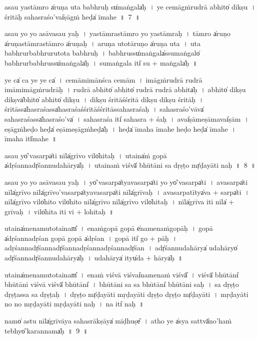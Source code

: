 \documentclass[parskip, DIV=14]{scrartcl}
\begin{document}
{\vspace{0.5cm}
a॒sau yastā॒mro a̍ru॒ṇa u॒ta ba॒bhruḥ su̍ma॒ṅgala̍ḥ~।
ye ce॒māgṁru॒drā a॒bhito̍ di॒kṣu~।
 śri॒tāḥ sahasra॒śo'vai̍ṣā॒gṁ॒ heḍa̍ īmahe~॥~7~॥

a॒sau yo yo a॒sāva॒sau yaḥ~।
yastā॒mrastā॒mro yo yastā॒mraḥ~।
tā॒mro a̍ru॒ṇo a̍ru॒ṇastā॒mrastā॒mro a̍ru॒ṇaḥ~।
a॒ru॒ṇa u॒totāru॒ṇo a̍ru॒ṇa u॒ta~।
u॒ta ba॒bhrurba॒bhruru॒tota ba॒bhruḥ~।
ba॒bhrussu̍ma॒ṅgala̍ssuma॒ṅgalo̍ ba॒bhrurba॒bhrussu̍ma॒ṅgala̍ḥ~।
su॒ma॒ṅgala॒ iti̍ su + ma॒ṅgala̍ḥ~॥

ye ca̍ ca॒ ye ye ca̍~।
ce॒māmi॒mānśca ce॒mām~।
i॒māgṁru॒drā ru॒drā  i॒māmi॒māgṁru॒drāḥ~।
ru॒drā a॒bhito̍ a॒bhito̍ ru॒drā ru॒drā a॒bhita̍ḥ~।
a॒bhito̍ di॒kṣu di॒kṣva̍bhito̍ a॒bhito̍ di॒kṣu~।
di॒kṣu śri॒tāśśri॒tā di॒kṣu di॒kṣu śri॒tāḥ~।
śri॒tāssa̍hasra॒śassa̍hasra॒śaśśri॒tāśśri॒tāssahasra॒śaḥ~।
sa॒ha॒sra॒śo'vāva̍ sahasra॒śassa̍hasra॒śo'va̍~।
sa॒ha॒sra॒śa iti̍ sahasra + śaḥ~।
avai̍ṣāmeṣā॒mavai̍ṣām~।
e॒ṣā॒gṁ॒heḍo॒ heḍa̍ eṣāmeṣā॒gṁ॒heḍa̍ḥ~।
heḍa̍ īmaha īmahe॒ heḍo॒ heḍa̍ īmahe~।
ī॒ma॒ha॒ itī̍mahe~॥

\vspace{0.5cm}
a॒sau yo̍'vasarpa̍ti॒ nīla̍grīvo॒ vilo̍hitaḥ~।
u॒taina̍ṁ go॒pā a̍dṛśa॒nnadṛ̍śannudahā॒rya̍ḥ~।
u॒taina॒ṁ viśvā̍ bhū॒tāni॒ sa dṛ॒ṣṭo mṛ̍ḍayāti naḥ~॥~8~॥

a॒sau yo yo a॒sāva॒sau yaḥ~।
yo̍'va॒sarpa̍tyava॒sarpa̍ti॒ yo yo̍'va॒sarpa̍ti~।
a॒va॒sarpa̍ti॒ nīla̍grīvo॒ nīla̍grīvo'va॒sarpa̍tyava॒sarpa̍ti॒ nīla̍grīvaḥ~।
a॒va॒sarpa॒tītya̍va + sarpa̍ti~।
nīla̍grīvo॒ vilo̍hito॒  vilo̍hito॒ nīla̍grīvo॒ nīla̍grīvo॒ vilo̍hitaḥ~।
nīla̍grīva॒ iti॒ nīla̍ + grī॒va॒ḥ~।
vilo̍hita॒ iti॒ vi + lo॒hi॒ta॒ḥ~॥

u॒taina̍menamu॒totainam̎~।
e॒na॒ṁgo॒pā go॒pā e̍namenaṁgo॒pāḥ~।
go॒pā a̍dṛśannadṛśan go॒pā go॒pā a̍dṛśan~।
go॒pā iti̍ go + pāḥ~।
a॒dṛ॒śa॒nnadṛ̍śa॒nnadṛ̍śannadṛśannadṛśa॒nnadṛ̍śan~।
adṛ̍śannudahā॒rya̍ udahā॒ryo̍ adṛ̍śa॒nnadṛ̍śannudahā॒rya̍ḥ~।
u॒da॒hā॒rya̍ ityu̍da + hā॒rya̍ḥ~॥

u॒taina̍menamu॒totainam̎~।
e॒na॒ṁ viśvā॒ viśvai̍namena॒ṁ viśvā̎~।
viśvā̍ bhū॒tāni̍ bhū॒tāni॒ viśvā॒ viśvā̍ bhū॒tāni̍~।
bhū॒tāni॒ sa sa bhū॒tāni̍ bhū॒tāni॒ saḥ~।
sa dṛ॒ṣṭo dṛ॒ṣṭassa sa dṛ॒ṣṭaḥ~।
dṛ॒ṣṭo mṛ̍ḍayāti mṛḍayāti dṛ॒ṣṭo dṛ॒ṣṭo mṛ̍ḍayāti~।
mṛ॒ḍa॒yā॒ti॒ no॒ no॒ mṛ॒ḍa॒yā॒ti॒ mṛ॒ḍa॒yā॒ti॒ na॒ḥ~।
na॒ iti̍ naḥ~॥

\vspace{0.5cm}
namo̍ astu॒ nīla̍grīvāya sahasrā॒kṣāya̍ mī॒ḍhuṣe̎~।
atho॒ ye a̍sya॒ sattvā̍no॒'haṁ tebhyo̍'kara॒nnama̍ḥ~॥~9~॥

}
\end{document}
